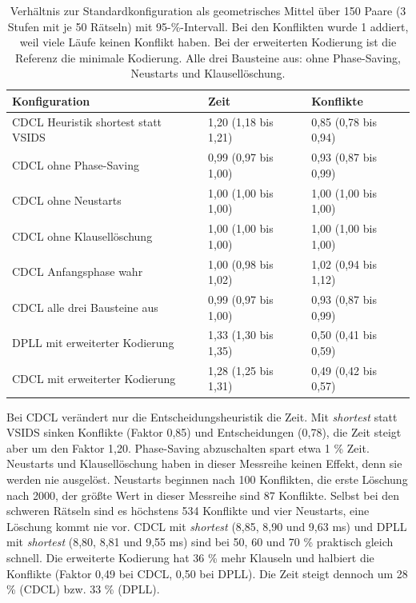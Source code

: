 \begin{table}[htb]
\centering\small
\caption{Verhältnis zur Standardkonfiguration als geometrisches Mittel über 150 Paare (3 Stufen mit je 50 Rätseln) mit 95-\%-Intervall. Bei den Konflikten wurde 1 addiert, weil viele Läufe keinen Konflikt haben. Bei der erweiterten Kodierung ist die Referenz die minimale Kodierung. Alle drei Bausteine aus: ohne Phase-Saving, Neustarts und Klausellöschung.}\label{tab:bausteine}
\begin{tabular}{@{}l l l@{}}
\toprule
Konfiguration & Zeit & Konflikte \\
\midrule
CDCL Heuristik shortest statt VSIDS & 1,20 (1,18 bis 1,21) & 0,85 (0,78 bis 0,94) \\
CDCL ohne Phase-Saving & 0,99 (0,97 bis 1,00) & 0,93 (0,87 bis 0,99) \\
CDCL ohne Neustarts & 1,00 (1,00 bis 1,00) & 1,00 (1,00 bis 1,00) \\
CDCL ohne Klausellöschung & 1,00 (1,00 bis 1,00) & 1,00 (1,00 bis 1,00) \\
CDCL Anfangsphase wahr & 1,00 (0,98 bis 1,02) & 1,02 (0,94 bis 1,12) \\
CDCL alle drei Bausteine aus & 0,99 (0,97 bis 1,00) & 0,93 (0,87 bis 0,99) \\
DPLL mit erweiterter Kodierung & 1,33 (1,30 bis 1,35) & 0,50 (0,41 bis 0,59) \\
CDCL mit erweiterter Kodierung & 1,28 (1,25 bis 1,31) & 0,49 (0,42 bis 0,57) \\
\bottomrule
\end{tabular}
\end{table}

Bei CDCL verändert nur die Entscheidungsheuristik die Zeit. Mit \emph{shortest} statt VSIDS sinken Konflikte (Faktor 0,85) und Entscheidungen (0,78), die Zeit steigt aber um den Faktor 1,20. Phase-Saving abzuschalten spart etwa 1 \% Zeit. Neustarts und Klausellöschung haben in dieser Messreihe keinen Effekt, denn sie werden nie ausgelöst. Neustarts beginnen nach 100 Konflikten, die erste Löschung nach 2000, der größte Wert in dieser Messreihe sind 87 Konflikte. Selbst bei den schweren Rätseln sind es höchstens 534 Konflikte und vier Neustarts, eine Löschung kommt nie vor. CDCL mit \emph{shortest} (8,85, 8,90 und 9,63 ms) und DPLL mit \emph{shortest} (8,80, 8,81 und 9,55 ms) sind bei 50, 60 und 70 \% praktisch gleich schnell. Die erweiterte Kodierung hat 36 \% mehr Klauseln und halbiert die Konflikte (Faktor 0,49 bei CDCL, 0,50 bei DPLL). Die Zeit steigt dennoch um 28 \% (CDCL) bzw. 33 \% (DPLL).

